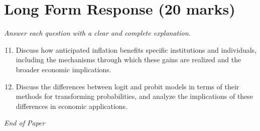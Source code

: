 \documentclass[12pt]{article}
\begin{document}
\section*{Long Form Response (20 marks)}
\textit{Answer each question with a clear and complete explanation.}
\begin{enumerate}[label=\arabic*.]
\setcounter{enumi}{10}
\item Discuss how anticipated inflation benefits specific institutions and individuals, including the mechanisms through which these gains are realized and the broader economic implications.
\item Discuss the differences between logit and probit models in terms of their methods for transforming probabilities, and analyze the implications of these differences in economic applications.
\end{enumerate}

\vfill
\noindent\textit{End of Paper}
\end{document}
